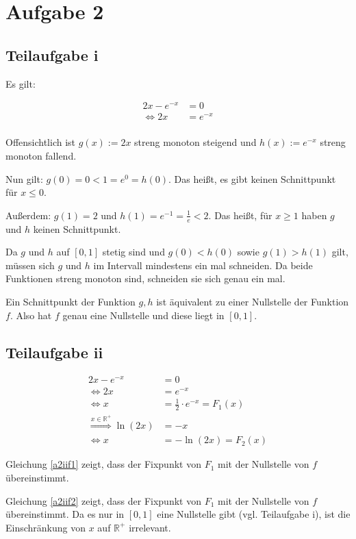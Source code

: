 \section*{Aufgabe 2}
\subsection*{Teilaufgabe i}
Es gilt:

\begin{align}
    2x - e^{-x} &= 0\\
    \Leftrightarrow 2x &= e^{-x}\\
\end{align}

Offensichtlich ist $g(x) := 2x$ streng monoton steigend und $h(x) := e^{-x}$ streng
monoton fallend.

Nun gilt: $g(0) = 0 < 1 = e^0 = h(0)$. Das heißt, es gibt keinen
Schnittpunkt für $x \leq 0$.

Außerdem: $g(1) = 2$ und $h(1) = e^{-1} = \frac{1}{e} < 2$.
Das heißt, für $x \geq 1$ haben $g$ und $h$ keinen Schnittpunkt.

Da $g$ und $h$ auf $[0,1]$ stetig sind und $g(0) < h(0)$ sowie $g(1) > h(1)$
gilt, müssen sich $g$ und $h$ im Intervall mindestens ein mal schneiden.
Da beide Funktionen streng monoton sind, schneiden sie sich genau
ein mal.

Ein Schnittpunkt der Funktion $g,h$ ist äquivalent zu einer
Nullstelle der Funktion $f$. Also hat $f$ genau eine Nullstelle
und diese liegt in $[0,1]$.

\subsection*{Teilaufgabe ii}
    \begin{align}
        2x - e^{-x} &= 0\\
    \Leftrightarrow 2x &= e^{-x}\\
    \Leftrightarrow x &= \frac{1}{2} \cdot e^{-x} = F_1(x) \label{a2iif1}\\
    \stackrel{x \in \mathbb{R}^+}{\Rightarrow} \ln(2x) &= -x\\
    \Leftrightarrow x &= - \ln(2x) = F_2(x)\label{a2iif2}
    \end{align}

Gleichung \ref{a2iif1} zeigt, dass der Fixpunkt von $F_1$ mit der 
Nullstelle von $f$ übereinstimmt.

Gleichung \ref{a2iif2} zeigt, dass der Fixpunkt von $F_1$ mit der 
Nullstelle von $f$ übereinstimmt. Da es nur in $[0,1]$ eine Nullstelle
gibt (vgl. Teilaufgabe i), ist die Einschränkung von $x$ auf $\mathbb{R}^+$
irrelevant.

